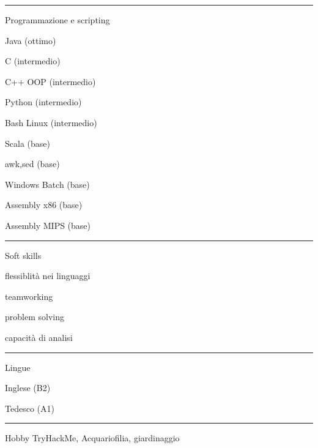 \documentclass[a4paper]{letter}
\begin{document}
\begin{minipage}[t]{0.30\textwidth}
\setlength{\baselineskip}{1.5\baselineskip}
\color{white}

\vspace{2.1 mm}
\rule{\linewidth}{0.4pt}

{\large Programmazione e scripting}

\faCode \quad Java (ottimo)

\faCode \quad C (intermedio)

\faCode \quad C++ OOP (intermedio)

\faCode \quad Python (intermedio)

\faCode \quad Bash Linux (intermedio)

\faCode \quad Scala (base)

\faCode \quad awk,sed (base)

\faCode \quad Windows Batch (base)

\faCode \quad Assembly x86 (base)

\faCode \quad Assembly MIPS (base)

\rule{\linewidth}{0.4pt}

{\large Soft skills}

\faCircleNotch \quad flessiblità nei linguaggi

\faCircleNotch \quad teamworking

\faCircleNotch \quad problem solving

\faCircleNotch \quad capacità di analisi

\rule{\linewidth}{0.4pt}

{\large Lingue}

\faLanguage \quad Inglese  (B2)

\faLanguage \quad Tedesco  (A1)

\rule{\linewidth}{0.4pt}

{\large Hobby}
\newline TryHackMe, Acquariofilia, giardinaggio

\end{minipage}
\hfill
\end{document}
